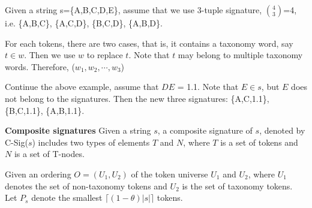  Given a string s=\{A,B,C,D,E\}, assume that we use 3-tuple signature, $\binom{4}{3}$=4, i.e. \{A,B,C\}, \{A,C,D\}, \{B,C,D\}, \{A,B,D\}.

For each tokens, there are two cases, that is, it contains a taxonomy word, say $t \in w$. Then we use $w$ to replace $t$. Note that $t$ may belong to multiple taxonomy words. Therefore, ($w_1, w_2, \cdots, w_3$)

Continue the above example, assume that $DE$ = 1.1. Note that $E \in s $, but $E$ does not belong to the signatures. Then the new three signatures:  \{A,C,1.1\}, \{B,C,1.1\}, \{A,B,1.1\}.

\noindent \textbf{Composite signatures} Given a string $s$, a composite signature of $s$, denoted by C-Sig($s$) includes two types of elements $T$ and $N$, where $T$ is a set of tokens and $N$ is a set of T-nodes.

Given an
ordering $O = (U_1 , U_2 )$ of the token universe $U_1$ and $U_2$, where $U_1$ denotes the set of non-taxonomy tokens and $U_2$ is the set of taxonomy tokens. Let $P_s$ denote the smallest $\lceil(1-\theta)|s|\rceil$ tokens.

%
%
%


%
%

